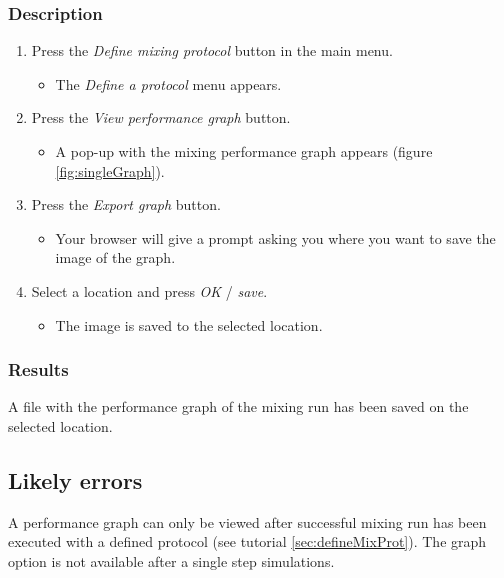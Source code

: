 \subsubsection{Description}
\begin{enumerate}
	\item  Press the \emph{Define mixing protocol} button in the main menu.
		\begin{itemize}
            		\item The \emph{Define a protocol} menu appears.
		\end{itemize}
			\item Press the \emph{View performance graph} button.
		\begin{itemize}
            		\item A pop-up with the mixing performance graph appears (figure \ref{fig:singleGraph}).
		\end{itemize}


    \item Press the \emph{Export graph} button.
		\begin{itemize}
             \item Your browser will give a prompt asking you where you want to save the image of the graph.
		\end{itemize}
    \item  Select a location and press \emph{OK} / \emph{save}.
		\begin{itemize}
           \item The image is saved to the selected location.
		\end{itemize}
\end{enumerate}

\subsubsection{Results}
A file with the performance graph of the mixing run has been saved on the selected location.

\subsection{Likely errors}
A performance graph can only be viewed after successful mixing run has been executed with a defined protocol (see tutorial \ref{sec:defineMixProt}). The graph option is not available after a single step simulations.

